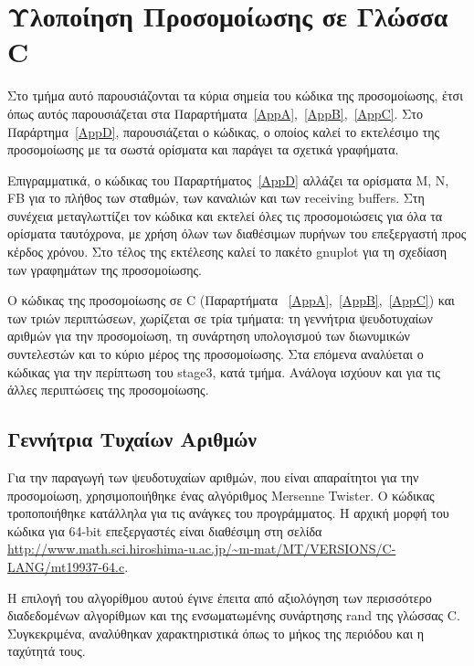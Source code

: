\documentclass[12pt]{report}
\begin{document}
\section{Υλοποίηση Προσομοίωσης σε Γλώσσα \textlatin{C}}
Στο τμήμα αυτό παρουσιάζονται τα κύρια σημεία του κώδικα της προσομοίωσης, έτσι όπως αυτός παρουσιάζεται στα Παραρτήματα~\ref{AppA},~\ref{AppB},~\ref{AppC}. Στο Παράρτημα~\ref{AppD}, παρουσιάζεται ο κώδικας, ο οποίος καλεί το εκτελέσιμο της προσομοίωσης με τα σωστά ορίσματα και παράγει τα σχετικά γραφήματα.

Επιγραμματικά, ο κώδικας του Παραρτήματος~\ref{AppD} αλλάζει τα ορίσματα \textlatin{M, N, FB} για το πλήθος των σταθμών, των καναλιών και των \textlatin{receiving buffers}. Στη συνέχεια μεταγλωττίζει τον κώδικα και εκτελεί όλες τις προσομοιώσεις για όλα τα ορίσματα ταυτόχρονα, με χρήση όλων των διαθέσιμων πυρήνων του επεξεργαστή προς κέρδος χρόνου. Στο τέλος της εκτέλεσης καλεί το πακέτο \textlatin{gnuplot} για τη σχεδίαση των γραφημάτων της προσομοίωσης.

Ο κώδικας της προσομοίωσης σε \textlatin{C} (Παραρτήματα ~\ref{AppA},~\ref{AppB},~\ref{AppC}) και των τριών περιπτώσεων, χωρίζεται σε τρία τμήματα: τη γεννήτρια ψευδοτυχαίων αριθμών για την προσομοίωση, τη συνάρτηση υπολογισμού των διωνυμικών συντελεστών και το κύριο μέρος της προσομοίωσης. Στα επόμενα αναλύεται ο κώδικας για την περίπτωση του \textlatin{stage3}, κατά τμήμα. Ανάλογα ισχύουν και για τις άλλες περιπτώσεις της προσομοίωσης.

\subsection{Γεννήτρια Τυχαίων Αριθμών}
Για την παραγωγή των ψευδοτυχαίων αριθμών, που είναι απαραίτητοι για την προσομοίωση, χρησιμοποιήθηκε ένας αλγόριθμος \textlatin{Mersenne Twister}. Ο κώδικας τροποποιήθηκε κατάλληλα για τις ανάγκες του προγράμματος. Η αρχική μορφή του κώδικα για 64-\textlatin{bit} επεξεργαστές είναι διαθέσιμη στη σελίδα \textlatin{\url{http://www.math.sci.hiroshima-u.ac.jp/~m-mat/MT/VERSIONS/C-LANG/mt19937-64.c}}.

Η επιλογή του αλγορίθμου αυτού έγινε έπειτα από αξιολόγηση των περισσότερο διαδεδομένων αλγορίθμων και της ενσωματωμένης συνάρτησης \textlatin{rand} της γλώσσας \textlatin{C}. Συγκεκριμένα, αναλύθηκαν χαρακτηριστικά όπως το μήκος της περιόδου και η ταχύτητά τους.
\end{document}
